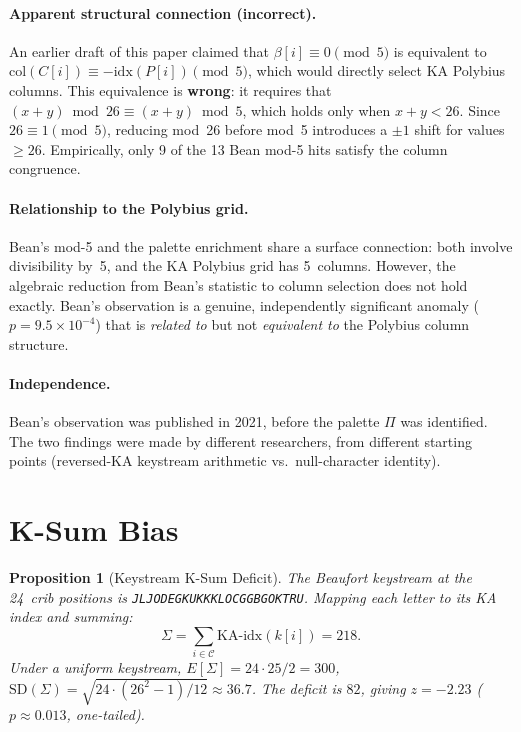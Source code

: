 \documentclass[11pt]{article}
\newtheorem{proposition}{Proposition}
\theoremstyle{remark}
\begin{document}
\paragraph{Apparent structural connection (incorrect).}
An earlier draft of this paper claimed that
$\beta[i] \equiv 0 \pmod{5}$ is equivalent to
$\mathrm{col}(C[i]) \equiv -\mathrm{idx}(P[i]) \pmod{5}$,
which would directly select KA Polybius columns.
This equivalence is \textbf{wrong}: it requires that
$(x + y) \bmod 26 \equiv (x + y) \bmod 5$,
which holds only when $x + y < 26$.
Since $26 \equiv 1 \pmod{5}$, reducing mod~26 before mod~5
introduces a $\pm 1$ shift for values $\geq 26$.  Empirically,
only 9 of the 13 Bean mod-5 hits satisfy the column congruence.

\paragraph{Relationship to the Polybius grid.}
Bean's mod-5 and the palette enrichment share a surface
connection: both involve divisibility by~5, and the KA Polybius
grid has 5~columns.  However, the algebraic reduction from
Bean's statistic to column selection does not hold exactly.
Bean's observation is a genuine, independently significant
anomaly ($p = 9.5 \times 10^{-4}$) that is \emph{related to}
but not \emph{equivalent to} the Polybius column structure.

\paragraph{Independence.}
Bean's observation was published in 2021, before the palette
$\Pi$ was identified.  The two findings were made by different
researchers, from different starting points (reversed-KA
keystream arithmetic vs.\ null-character identity).

\section{K-Sum Bias}

\begin{proposition}[Keystream K-Sum Deficit]\label{prop:ksum}
The Beaufort keystream at the 24~crib positions is
{\small\texttt{JLJODEGKUKKKLOCGGBGOKTRU}}.
Mapping each letter to its KA index and summing:
\[
\Sigma = \sum_{i \in \mathcal{C}} \mathrm{KA\text{-}idx}(k[i]) = 218.
\]
Under a uniform keystream, $E[\Sigma] = 24 \cdot 25/2 = 300$,
$\mathrm{SD}(\Sigma) = \sqrt{24 \cdot (26^2 - 1)/12} \approx 36.7$.
The deficit is $82$, giving $z = -2.23$ ($p \approx 0.013$,
one-tailed).
\end{proposition}
\end{document}
